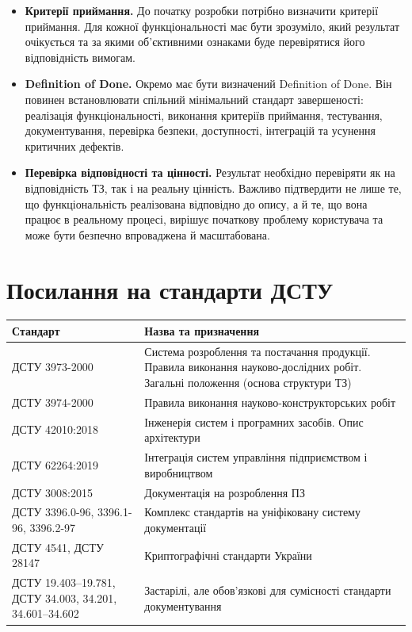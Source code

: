 \documentclass{article}
\begin{document}
\begin{itemize}
    \item \textbf{Критерії приймання.} До початку розробки потрібно визначити критерії приймання. Для кожної функціональності має бути зрозуміло, який результат очікується та за якими об’єктивними ознаками буде перевірятися його відповідність вимогам.
    \item \textbf{Definition of Done.} Окремо має бути визначений Definition of Done. Він повинен встановлювати спільний мінімальний стандарт завершеності: реалізація функціональності, виконання критеріїв приймання, тестування, документування, перевірка безпеки, доступності, інтеграцій та усунення критичних дефектів.
    \item \textbf{Перевірка відповідності та цінності.} Результат необхідно перевіряти як на відповідність ТЗ, так і на реальну цінність. Важливо підтвердити не лише те, що функціональність реалізована відповідно до опису, а й те, що вона працює в реальному процесі, вирішує початкову проблему користувача та може бути безпечно впроваджена й масштабована.
\end{itemize}

\newpage
\section{Посилання на стандарти ДСТУ}

\begin{longtable}{p{4cm}p{9cm}}
\toprule
\textbf{Стандарт} & \textbf{Назва та призначення} \\
\midrule
ДСТУ 3973-2000 & Система розроблення та постачання продукції. Правила виконання науково-дослідних робіт. Загальні положення (основа структури ТЗ) \\
ДСТУ 3974-2000 & Правила виконання науково-конструкторських робіт \\
ДСТУ 42010:2018 & Інженерія систем і програмних засобів. Опис архітектури \\
ДСТУ 62264:2019 & Інтеграція систем управління підприємством і виробництвом \\
ДСТУ 3008:2015 & Документація на розроблення ПЗ \\
ДСТУ 3396.0-96, 3396.1-96, 3396.2-97 & Комплекс стандартів на уніфіковану систему документації \\
ДСТУ 4541, ДСТУ 28147 & Криптографічні стандарти України \\
ДСТУ 19.403--19.781, ДСТУ 34.003, 34.201, 34.601--34.602 & Застарілі, але обов’язкові для сумісності стандарти документування \\
\bottomrule
\end{longtable}
\end{document}
